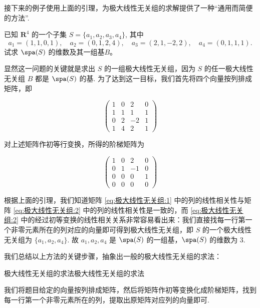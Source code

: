 接下来的例子使用上面的引理，为极大线性无关组的求解提供了一种``通用而简便的方法''.

\begin{example}{}{}
    已知 $\mathbf{R}^4$ 的一个子集 $S = \{a_1, a_2, a_3, a_4\}$, 其中
    \[
        a_1 = (1,1,0,1), \quad a_2 = (0,1,2,4), \quad
        a_3 = (2,1,-2,2), \quad a_4 = (0,1,1,1).
    \]
    试求 $\spa(S)$ 的维数及其一组基$B$。
\end{example}

\begin{solution}

    显然这一问题的关键就是求出 $S$ 的一组极大线性无关组，因为 $S$ 的任一极大线性无关组 $B$ 都是 $\spa(S)$ 的基. 为了达到这一目标，我们首先将四个向量按列排成矩阵，即

    \begin{equation} \label{eq:极大线性无关组:1}
        \begin{pmatrix}
            1 & 0 & 2  & 0 \\
            1 & 1 & 1  & 1 \\
            0 & 2 & -2 & 1 \\
            1 & 4 & 2 & 1
        \end{pmatrix}
    \end{equation}

    对上述矩阵作初等行变换，所得的阶梯矩阵为

    \begin{equation} \label{eq:极大线性无关组:2}
        \begin{pmatrix}
            1 & 0 & 2  & 0 \\
            0 & 1 & -1 & 0 \\
            0 & 0 & 0  & 1 \\
            0 & 0 & 0  & 0
        \end{pmatrix}
    \end{equation}

    根据上面的引理，我们知道矩阵 \eqref{eq:极大线性无关组:1} 中的列的线性相关性与矩阵 \eqref{eq:极大线性无关组:2} 中的列的线性相关性是一致的，而 \eqref{eq:极大线性无关组:2} 中的经过初等变换的线性相关关系非常容易看出来：我们直接找每一行第一个非零元素所在的列对应的向量即可得到极大线性无关组，即 $S$ 的一个极大线性无关组为 $\{a_1, a_2, a_4\}$. 故 $a_1, a_2, a_4$ 是 $\spa(S)$ 的一组基，$\spa(S)$ 的维数为 3.
\end{solution}

我们总结以上方法的关键步骤，抽象出一般的极大线性无关组的求法：
\begin{lemma}{极大线性无关组的求法}{极大线性无关组的求法}

    我们将题目给定的向量按列排成矩阵，然后将矩阵作初等变换化成阶梯矩阵，找到每一行第一个非零元素所在的列，提取出原矩阵对应列的向量即可.
\end{lemma}

